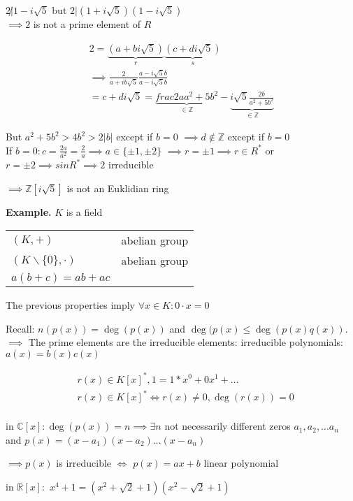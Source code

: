 $2 \not| 1 - i\sqrt{5}$ but $2 | (1+i\sqrt{5})(1-i\sqrt{5})$ \\
$\implies 2$ is not a prime element of $R$

\begin{align*}
  2 = \underbrace{(a+bi \sqrt{5})}_{r} \underbrace{(c+di\sqrt{5})}_{s}\\
  \implies \frac{2}{a+ib\sqrt{5}} \frac{a-i\sqrt{5}b}{a-i\sqrt{5}b} \\
  = c+di\sqrt{5} 
= \underbrace{frac{2a}{a^2 + 5b^2}}_{\in \mathbb{Z}} - \underbrace{i\sqrt{5} \frac{2b}{a^2 + 5b^2}}_{\in \mathbb{Z}}
\end{align*}

But $a^2 + 5b^2 > 4b^2 > 2|b|$ except if $ b=0$ $\implies d \not\in \mathbb{Z}$ except if $b=0$ \\
If $b=0: c = \frac{2a}{a^2} = \frac{2}{a} \implies a \in \{\pm 1, \pm 2\}$
$\implies r = \pm 1 \implies r \in R^{*}$ or $ r = \pm 2 \implies s in R^{*} \implies 2 $ irreducible

$\implies \mathbb{Z}[i\sqrt{5}]$ is not an Euklidian ring

\textbf{Example.}
$K$ is a field \\
\begin{tabular}{ll}
  $(K,+)$ &abelian group \\
  $(K\backslash \{0\}, \cdot)$ & abelian group \\
  $a(b+c) = ab + ac$
\end{tabular}
The previous properties imply $\forall x \in K: 0\cdot x = 0$

Recall: 
$n(p(x)) = \deg(p(x))$ and 
$\deg(p(x) \leq \deg(p(x) q(x))$. $\implies$ The prime elements are the irreducible elements: irreducible polynomials: $a(x) = b(x)c(x)$

\begin{align*}
  &r(x) \in K[x]^{*}, 1 = 1*x^0 + 0 x^1 + \ldots \\
  &r(x) \in K[x]^{*} \Leftrightarrow r(x) \neq 0, \deg(r(x)) = 0\\
\end{align*}

in $\mathbb{C}[x]: 
\deg(p(x)) = n \implies \exists n$ not necessarily different zeros $a_1, a_2, \ldots a_n$ and $p(x) = (x-a_1)(x-a_2) \ldots (x-a_n)$

$\implies p(x)$ is irreducible $\iff$ $p(x) = ax+b$ linear polynomial

in $\mathbb{R}[x]:$
$x^4 + 1 = (x^2 + \sqrt{2} +1)(x^2 - \sqrt{2} + 1)$

